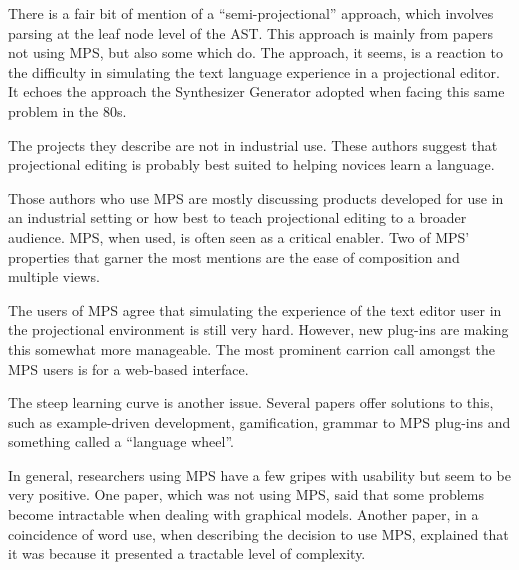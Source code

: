 There is a fair bit of mention of a ``semi-projectional'' approach, which involves parsing at the leaf node level of the AST.
This approach is mainly from papers not using MPS, but also some which do.
The approach, it seems, is a reaction to the difficulty in simulating the text language experience in a projectional editor. 
It echoes the approach the Synthesizer Generator adopted when facing this same problem in the 80s.

The projects they describe are not in industrial use.
These authors suggest that projectional editing is probably best suited to helping novices learn a language. 

Those authors who use MPS are mostly discussing products developed for use in an industrial setting or how best to teach projectional editing to a broader audience.
MPS, when used, is often seen as a critical enabler.
Two of MPS' properties that garner the most mentions are the ease of composition and multiple views.

The users of MPS agree that simulating the experience of the text editor user in the projectional environment is still very hard.
However, new plug-ins are making this somewhat more manageable.
The most prominent carrion call amongst the MPS users is for a web-based interface.

The steep learning curve is another issue.
Several papers offer solutions to this, such as example-driven development, gamification, grammar to MPS plug-ins and something called a ``language wheel''.

In general, researchers using MPS have a few gripes with usability but seem to be very positive.
One paper, which was not using MPS, said that some problems become intractable when dealing with graphical models.
Another paper, in a coincidence of word use, when describing the decision to use MPS, explained that it was because it presented a tractable level of complexity. 
